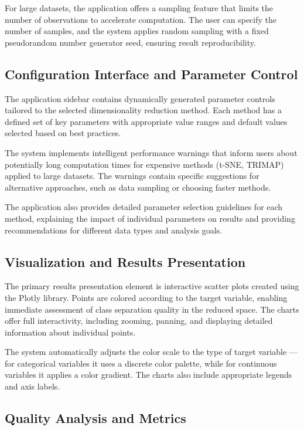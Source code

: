 \documentclass[a4paper, 12pt]{article}
\begin{document}
For large datasets, the application offers a sampling feature that limits the number of observations to accelerate computation. The user can specify the number of samples, and the system applies random sampling with a fixed pseudorandom number generator seed, ensuring result reproducibility.

\subsection{Configuration Interface and Parameter Control}

The application sidebar contains dynamically generated parameter controls tailored to the selected dimensionality reduction method. Each method has a defined set of key parameters with appropriate value ranges and default values selected based on best practices.

The system implements intelligent performance warnings that inform users about potentially long computation times for expensive methods (t-SNE, TRIMAP) applied to large datasets. The warnings contain specific suggestions for alternative approaches, such as data sampling or choosing faster methods.

The application also provides detailed parameter selection guidelines for each method, explaining the impact of individual parameters on results and providing recommendations for different data types and analysis goals.

\subsection{Visualization and Results Presentation}

The primary results presentation element is interactive scatter plots created using the Plotly library. Points are colored according to the target variable, enabling immediate assessment of class separation quality in the reduced space. The charts offer full interactivity, including zooming, panning, and displaying detailed information about individual points.

The system automatically adjusts the color scale to the type of target variable --- for categorical variables it uses a discrete color palette, while for continuous variables it applies a color gradient. The charts also include appropriate legends and axis labels.

\subsection{Quality Analysis and Metrics}
\end{document}
